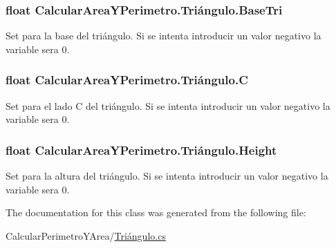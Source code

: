 \hypertarget{class_calcular_area_y_perimetro_1_1_tri_xC3_xA1ngulo_a920ba2504420213af32951b4fb7d6c9b}{}
\subsubsection[{Base\+Tri}]{\setlength{\rightskip}{0pt plus 5cm}float Calcular\+Area\+Y\+Perimetro.\+Triángulo.\+Base\+Tri\hspace{0.3cm}{\ttfamily [set]}}\label{class_calcular_area_y_perimetro_1_1_tri_xC3_xA1ngulo_a920ba2504420213af32951b4fb7d6c9b}


Set para la base del triángulo. Si se intenta introducir un valor negativo la variable sera 0. 

\hypertarget{class_calcular_area_y_perimetro_1_1_tri_xC3_xA1ngulo_a8d249cc94138997fbc0a51a1b54ffd3b}{}
\subsubsection[{C}]{\setlength{\rightskip}{0pt plus 5cm}float Calcular\+Area\+Y\+Perimetro.\+Triángulo.\+C\hspace{0.3cm}{\ttfamily [set]}}\label{class_calcular_area_y_perimetro_1_1_tri_xC3_xA1ngulo_a8d249cc94138997fbc0a51a1b54ffd3b}


Set para el lado C del triángulo. Si se intenta introducir un valor negativo la variable sera 0. 

\hypertarget{class_calcular_area_y_perimetro_1_1_tri_xC3_xA1ngulo_a03db58b7dc2703d2844fc6391088b891}{}
\subsubsection[{Height}]{\setlength{\rightskip}{0pt plus 5cm}float Calcular\+Area\+Y\+Perimetro.\+Triángulo.\+Height\hspace{0.3cm}{\ttfamily [set]}}\label{class_calcular_area_y_perimetro_1_1_tri_xC3_xA1ngulo_a03db58b7dc2703d2844fc6391088b891}


Set para la altura del triángulo. Si se intenta introducir un valor negativo la variable sera 0. 



The documentation for this class was generated from the following file\+:\begin{DoxyCompactItemize}
\item 
Calcular\+Perimetro\+Y\+Area/\hyperlink{_tri_xC3_xA1ngulo_8cs}{Triángulo.\+cs}\end{DoxyCompactItemize}
